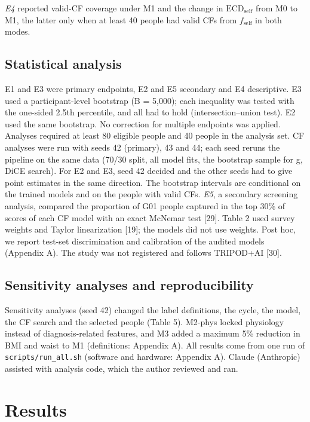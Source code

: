 \documentclass[preprint,review,12pt,times]{elsarticle}
\begin{document}
\emph{E4} reported valid-CF coverage under M1 and the change in
\(\mathrm{ECD}_{\mathrm{self}}\) from M0 to M1, the latter only when at
least 40 people had valid CFs from \(f_{\mathrm{self}}\) in both modes.

\subsection{Statistical analysis}

E1 and E3 were primary endpoints, E2 and E5 secondary and E4
descriptive. E3 used a participant-level bootstrap (B = 5,000); each
inequality was tested with the one-sided 2.5th percentile, and all had
to hold (intersection--union test). E2 used the same bootstrap. No
correction for multiple endpoints was applied. Analyses required at
least 80 eligible people and 40 people in the analysis set. CF analyses
were run with seeds 42 (primary), 43 and 44; each seed reruns the
pipeline on the same data (70/30 split, all model fits, the bootstrap
sample for g, DiCE search). For E2 and E3, seed 42 decided and the other
seeds had to give point estimates in the same direction. The bootstrap
intervals are conditional on the trained models and on the people with
valid CFs. \emph{E5}, a secondary screening analysis, compared the
proportion of G01 people captured in the top 30\% of scores of each CF
model with an exact McNemar test {[}29{]}. Table 2 used survey weights
and Taylor linearization {[}19{]}; the models did not use weights. Post
hoc, we report test-set discrimination and calibration of the audited
models (Appendix A). The study was not registered and follows TRIPOD+AI
{[}30{]}.

\subsection{Sensitivity analyses and reproducibility}

Sensitivity analyses (seed 42) changed the label definitions, the cycle,
the model, the CF search and the selected people (Table 5). M2-phys
locked physiology instead of diagnosis-related features, and M3 added a
maximum 5\% reduction in BMI and waist to M1 (definitions: Appendix A).
All results come from one run of
\texttt{scripts/\allowbreak{}run\_\allowbreak{}all.sh} (software and
hardware: Appendix A). Claude (Anthropic) assisted with analysis code,
which the author reviewed and ran.

\section{Results}
\end{document}
